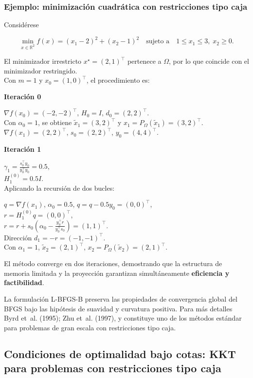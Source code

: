 \documentclass[
  spanish,
  us-letterpaper,
]{scrreprt}
\numberwithin{equation}{section}
\begin{document}
\subsubsection{Ejemplo: minimización cuadrática con restricciones tipo
caja}\label{ejemplo-minimizaciuxf3n-cuadruxe1tica-con-restricciones-tipo-caja}

Considérese

\[
\min_{x \in \mathbb{R}^2} f(x) = (x_1 - 2)^2 + (x_2 - 1)^2
\quad \text{sujeto a} \quad 1 \le x_1 \le 3, \; x_2 \ge 0.
\]

El minimizador irrestricto \(x^\star = (2,1)^\top\) pertenece a
\(\Omega\), por lo que coincide con el minimizador restringido.\\
Con \(m=1\) y \(x_0=(1,0)^\top\), el procedimiento es:

\textbf{Iteración 0}

\(\nabla f(x_0)=(-2,-2)^\top\), \(H_0=I\), \(d_0=(2,2)^\top\).\\
Con \(\alpha_0=1\), se obtiene \(\tilde{x}_1=(3,2)^\top\) y
\(x_1=P_\Omega(\tilde{x}_1)=(3,2)^\top\).\\
\(\nabla f(x_1)=(2,2)^\top\), \(s_0=(2,2)^\top\), \(y_0=(4,4)^\top\).

\textbf{Iteración 1}

\(\gamma_1=\tfrac{s_0^\top y_0}{y_0^\top y_0}=0.5\),\\
\(H_1^{(0)}=0.5I\).\\
Aplicando la recursión de dos bucles:

\(q=\nabla f(x_1)\), \(\alpha_0=0.5\), \(q=q-0.5y_0=(0,0)^\top\),\\
\(r=H_1^{(0)}q=(0,0)^\top\),\\
\(r=r+s_0(\alpha_0-\tfrac{y_0^\top r}{y_0^\top s_0})=(1,1)^\top\).\\
Dirección \(d_1=-r=(-1,-1)^\top\).\\
Con \(\alpha_1=1\), \(\tilde{x}_2=(2,1)^\top\),
\(x_2=P_\Omega(\tilde{x}_2)=(2,1)^\top\).

El método converge en dos iteraciones, demostrando que la estructura de
memoria limitada y la proyección garantizan simultáneamente
\textbf{eficiencia y factibilidad}.

La formulación L-BFGS-B preserva las propiedades de convergencia global
del BFGS bajo las hipótesis de suavidad y curvatura positiva. Para más
detalles Byrd et~al. (1995); Zhu et~al. (1997), y constituye uno de los
métodos estándar para problemas de gran escala con restricciones tipo
caja.

\subsection{Condiciones de optimalidad bajo cotas: KKT para problemas
con restricciones tipo caja}\label{sec-kkt_caja}
\end{document}
